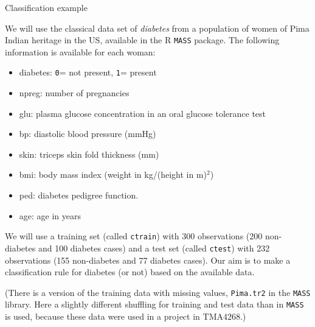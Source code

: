 \documentclass[
  ignorenonframetext,
]{beamer}
\providecommand{\tightlist}{%
  \setlength{\itemsep}{0pt}\setlength{\parskip}{0pt}}
\begin{document}
\begin{frame}[fragile]

\begin{block}{Classification example}

We will use the classical data set of \emph{diabetes} from a population
of women of Pima Indian heritage in the US, available in the R
\texttt{MASS} package. The following information is available for each
woman:

\begin{itemize}
\tightlist
\item
  diabetes: \texttt{0}= not present, \texttt{1}= present
\item
  npreg: number of pregnancies
\item
  glu: plasma glucose concentration in an oral glucose tolerance test
\item
  bp: diastolic blood pressure (mmHg)
\item
  skin: triceps skin fold thickness (mm)
\item
  bmi: body mass index (weight in kg/(height in m)\(^2\))
\item
  ped: diabetes pedigree function.
\item
  age: age in years
\end{itemize}

We will use a training set (called \texttt{ctrain}) with 300
observations (200 non-diabetes and 100 diabetes cases) and a test set
(called \texttt{ctest}) with 232 observations (155 non-diabetes and 77
diabetes cases). Our aim is to make a classification rule for diabetes
(or not) based on the available data.

(There is a version of the training data with missing values,
\texttt{Pima.tr2} in the \texttt{MASS} library. Here a slightly
different shuffling for training and test data than in \texttt{MASS} is
used, because these data were used in a project in TMA4268.)

\end{block}

\end{frame}
\end{document}

